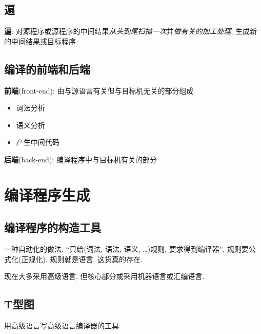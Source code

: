     \subsection{遍}

        \textbf{遍}: 对源程序或源程序的中间结果\textsl{从头到尾扫描一次}并\textsl{做有关的加工处理}, 生成新的中间结果或目标程序

    \subsection{编译的前端和后端}

        \textbf{前端}(front-end): 由与源语言有关但与目标机无关的部分组成

        \begin{itemize}
            \item 词法分析
            \item 语义分析
            \item 产生中间代码
        \end{itemize}

        \textbf{后端}(back-end): 编译程序中与目标机有关的部分

\section{编译程序生成}

    \subsection{编译程序的构造工具}

        一种自动化的做法: ``只给(词法, 语法, 语义, \ldots)规则, 要求得到编译器'', 规则要公式化(正规化). 规则就是语言. 这货真的存在.

        现在大多采用高级语言, 但核心部分或采用机器语言或汇编语言.

    \subsection{T型图}

        用高级语言写高级语言编译器的工具.

